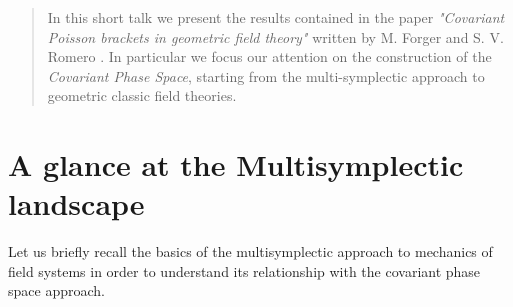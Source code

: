 \documentclass[a4paper,12pt,fleqn]{scrartcl}  %
\begin{document}
\maketitle

\begin{abstract}
In this short talk we present the results contained in the paper \emph{"Covariant Poisson brackets in geometric field theory"} written by M. Forger and S. V. Romero \cite{forgeromero}.
In particular we focus our attention on the construction of the \emph{Covariant Phase Space}, starting from the multi-symplectic approach to geometric classic field theories.

\end{abstract}

\section{A glance at the Multisymplectic landscape}
Let us briefly recall the basics of the multisymplectic approach to mechanics of field systems in order to understand its relationship with the covariant phase space approach.

\begin{center}
  
\end{center}
\end{document}
